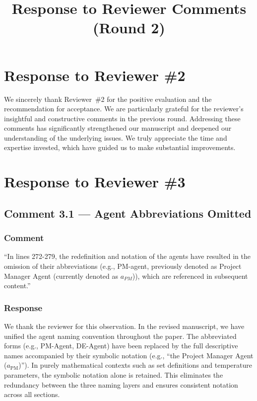 \documentclass[11pt,a4paper]{article}
\title{Response to Reviewer Comments (Round 2)}
\author{}
\date{}
\begin{document}
\maketitle
\setcounter{tocdepth}{2}
\tableofcontents
\newpage

\section{Response to Reviewer \#2}

We sincerely thank Reviewer~\#2 for the positive evaluation and the recommendation for acceptance. We are particularly grateful for the reviewer's insightful and constructive comments in the previous round. Addressing these comments has significantly strengthened our manuscript and deepened our understanding of the underlying issues. We truly appreciate the time and expertise invested, which have guided us to make substantial improvements.

\section{Response to Reviewer \#3}

\subsection{Comment 3.1 --- Agent Abbreviations Omitted}

\subsubsection{Comment}
``In lines 272-279, the redefinition and notation of the agents have resulted in the omission of their abbreviations (e.g., PM-agent, previously denoted as Project Manager Agent (currently denoted as $a_{PM}$)), which are referenced in subsequent content.''

\subsubsection{Response}
We thank the reviewer for this observation. In the revised manuscript, we have unified the agent naming convention throughout the paper. The abbreviated forms (e.g., PM-Agent, DE-Agent) have been replaced by the full descriptive names accompanied by their symbolic notation (e.g., ``the Project Manager Agent ($a_{\text{PM}}$)''). In purely mathematical contexts such as set definitions and temperature parameters, the symbolic notation alone is retained. This eliminates the redundancy between the three naming layers and ensures consistent notation across all sections.
\end{document}
